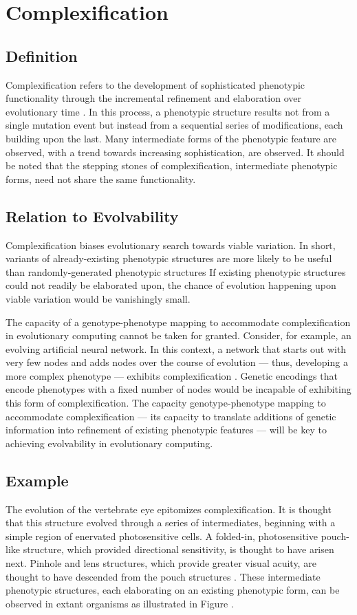 \section{Complexification} \label{sec:complexification}
\subsection{Definition}
Complexification refers to the development of sophisticated phenotypic functionality through the incremental refinement and elaboration over evolutionary time \cite[pg 202]{Downing2015IntelligenceSystems}.
In this process, a phenotypic structure results not from a single mutation event but instead from a sequential series of modifications, each building upon the last. 
Many intermediate forms of the phenotypic feature are observed, with a trend towards increasing sophistication, are observed.
It should be noted that the stepping stones of complexification, intermediate phenotypic forms, need not share the same functionality.

\subsection{Relation to Evolvability}
Complexification biases evolutionary search towards viable variation. In short, variants of already-existing phenotypic structures are more likely to be useful than randomly-generated phenotypic structures
If existing phenotypic structures could not readily be elaborated upon, the chance of evolution happening upon viable variation would be vanishingly small.

The capacity of a genotype-phenotype mapping to accommodate complexification in evolutionary computing cannot be taken for granted.
Consider, for example, an evolving artificial neural network.
In this context, a network that starts out with very few nodes and adds nodes over the course of evolution --- thus, developing a more complex phenotype --- exhibits complexification \cite{Clune2011OnRegularity}.
Genetic encodings that encode phenotypes with a fixed number of nodes would be incapable of exhibiting this form of complexification.
The capacity genotype-phenotype mapping to accommodate complexification --- its capacity to translate additions of genetic information into refinement of existing phenotypic features --- will be key to achieving evolvability in evolutionary computing.

\subsection{Example}
The evolution of the vertebrate eye epitomizes complexification.
It is thought that this structure evolved through a series of intermediates, beginning with a simple region of enervated photosensitive cells.
A folded-in, photosensitive pouch-like structure, which provided directional sensitivity, is thought to have arisen next.
Pinhole and lens structures, which provide greater visual acuity, are thought to have descended from the pouch structures \cite{Gregory2008TheOrgans}.
These intermediate phenotypic structures, each elaborating on an existing phenotypic form, can be observed in extant organisms as illustrated in Figure .

